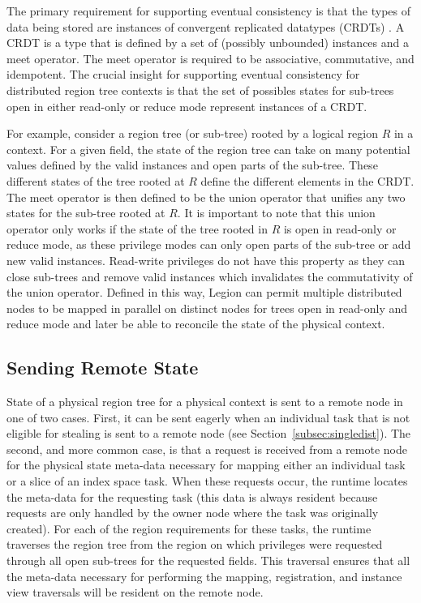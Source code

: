 The primary requirement for supporting eventual consistency
is that the types of data being stored are instances
of convergent replicated datatypes (CRDTs) \cite{CRDT09}.
A CRDT is a type that is defined by a set of (possibly 
unbounded) instances and a meet operator.  The meet
operator is required to be associative, commutative,
and idempotent. The crucial insight for supporting 
eventual consistency for distributed region tree contexts
is that the set of possibles states for 
sub-trees open in either read-only or reduce mode 
represent instances of a CRDT.

For example, consider a region tree (or sub-tree) rooted
by a logical region $R$ in a context. For a given field,
the state of the region tree can take on many potential
values defined by the valid instances and open parts of
the sub-tree. These different states of the tree rooted
at $R$ define the different elements in the CRDT. The
meet operator is then defined to be the union operator
that unifies any two states for the sub-tree rooted 
at $R$. It is important to note that this union operator
only works if the state of the tree rooted in $R$ is
open in read-only or reduce mode, as these privilege
modes can only open parts of the sub-tree or add new
valid instances.  Read-write privileges do not have
this property as they can close sub-trees and remove
valid instances which invalidates the commutativity
of the union operator. Defined in this way, Legion can
permit multiple distributed nodes to be mapped in parallel 
on distinct nodes for trees open in read-only and reduce
mode and later be able to reconcile the state of the 
physical context.

\subsection{Sending Remote State}
\label{subsec:sendstate}

State of a physical region tree for a physical
context is sent to a remote node in one of two
cases. First, it can be sent eagerly when an
individual task that is not eligible for stealing 
is sent to a remote node (see 
Section~\ref{subsec:singledist}). The second,
and more common case, is that a request is received
from a remote node for the physical state 
meta-data necessary for mapping either an
individual task or a slice of an index space
task. When these requests occur, the runtime 
locates the meta-data for the requesting task
(this data is always resident because requests
are only handled by the owner node where the task
was originally created). For each of the region
requirements for these tasks, the runtime traverses
the region tree from the region on which
privileges were requested through all open
sub-trees for the requested fields. This traversal
ensures that all the meta-data necessary for performing
the mapping, registration, and instance view 
traversals will be resident on the remote node.


